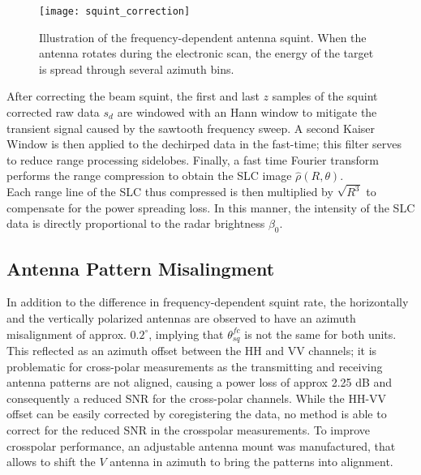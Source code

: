 \begin{figure}[ht]
	\centering
	\texttt{[image: squint\_correction]}
	\caption{Illustration of the frequency-dependent antenna squint. When the antenna rotates during the electronic scan, the energy of the target is spread through several azimuth bins.}
	\label{fig:squint_correction}
\end{figure}
After correcting the beam squint,  the first and last $z$ samples of the squint corrected raw data $s_{d}$ are windowed with an Hann window to mitigate the transient signal caused by the sawtooth frequency sweep. A second Kaiser Window is then applied to the dechirped data in the fast-time; this filter serves to reduce range processing sidelobes. Finally, a fast time Fourier transform performs the range compression to obtain the SLC image $\hat{\rho}\left(R, \theta\right)$.\\ Each range line of the SLC thus compressed is then multiplied by $\sqrt{R^3}$ to compensate for the power spreading loss. In this manner, the intensity of the SLC data is directly proportional to the radar brightness $\beta_{0}$.
\subsection{Antenna Pattern Misalingment}\label{sec:misalingment}
In addition to the difference in frequency-dependent squint rate, the horizontally and the vertically polarized antennas are observed to have an azimuth misalignment of approx. $0.2^\circ$,
implying that $\theta_{sq}^{fc}$ is not the same for both units. This reflected as an azimuth offset between the HH and VV channels; it is problematic for cross-polar measurements as the transmitting and receiving antenna patterns are not aligned, causing a power loss of approx 2.25 dB and consequently a reduced SNR for the cross-polar channels. While the HH-VV offset can be easily corrected by coregistering the data, no method is able to correct for the reduced SNR in the crosspolar measurements. To improve crosspolar performance, an adjustable antenna mount was manufactured, that allows to shift the $V$ antenna in azimuth to bring the patterns into alignment.\\
